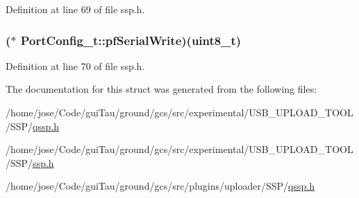 Definition at line 69 of file ssp.\-h.

\hypertarget{struct_port_config__t_a4f05f6e2fc7ec69a863b303e44191881}{
\subsubsection[{pf\-Serial\-Write}]{($\ast$ Port\-Config\-\_\-t\-::pf\-Serial\-Write)(uint8\-\_\-t)}}\label{struct_port_config__t_a4f05f6e2fc7ec69a863b303e44191881}


Definition at line 70 of file ssp.\-h.



The documentation for this struct was generated from the following files\-:\begin{DoxyCompactItemize}
\item 
/home/jose/\-Code/gui\-Tau/ground/gcs/src/experimental/\-U\-S\-B\-\_\-\-U\-P\-L\-O\-A\-D\-\_\-\-T\-O\-O\-L/\-S\-S\-P/\hyperlink{experimental_2_u_s_b___u_p_l_o_a_d___t_o_o_l_2_s_s_p_2qssp_8h}{qssp.\-h}\item 
/home/jose/\-Code/gui\-Tau/ground/gcs/src/experimental/\-U\-S\-B\-\_\-\-U\-P\-L\-O\-A\-D\-\_\-\-T\-O\-O\-L/\-S\-S\-P/\hyperlink{ssp_8h}{ssp.\-h}\item 
/home/jose/\-Code/gui\-Tau/ground/gcs/src/plugins/uploader/\-S\-S\-P/\hyperlink{plugins_2uploader_2_s_s_p_2qssp_8h}{qssp.\-h}\end{DoxyCompactItemize}
